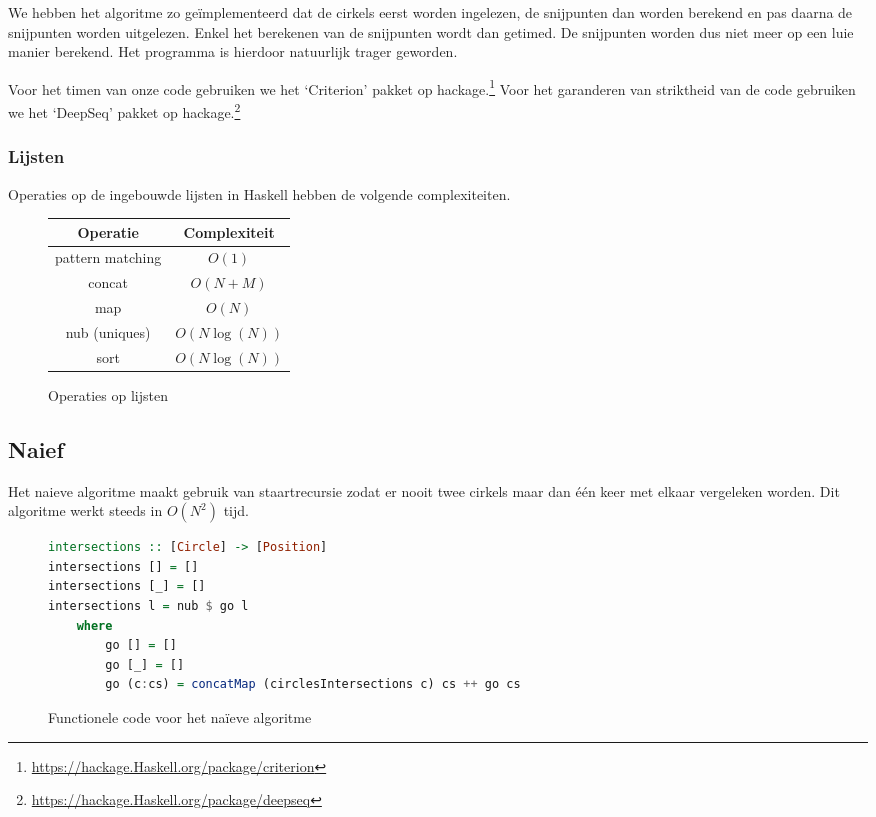 We hebben het algoritme zo ge\"implementeerd dat de cirkels eerst
worden ingelezen, de snijpunten dan worden berekend en pas daarna de
snijpunten worden uitgelezen. Enkel het berekenen van de snijpunten
wordt dan getimed. De snijpunten worden dus niet meer op een luie
manier berekend. Het programma is hierdoor natuurlijk trager geworden.

Voor het timen van onze code gebruiken we het `Criterion' pakket op hackage.\footnote{\url{https://hackage.Haskell.org/package/criterion}}
Voor het garanderen van striktheid van de code gebruiken we het `DeepSeq' pakket op hackage.\footnote{\url{https://hackage.Haskell.org/package/deepseq}}

\subsubsection{Lijsten}
Operaties op de ingebouwde lijsten in Haskell hebben de volgende complexiteiten.
\begin{figure}[H]
\centering
\begin{tabular}{|c|c|}
\hline
Operatie & Complexiteit\\
\hline\hline
pattern matching & $O(1)$\\\hline
concat & $O(N+M)$\\\hline
map & $O(N)$\\\hline
nub (uniques) & $O(N\log(N))$\\\hline
sort & $O(N\log(N))$\\\hline
\end{tabular}
\label{fig:list_performance}
\caption{Operaties op lijsten}
\end{figure}

\newpage
\subsection{Naief}
Het naieve algoritme maakt gebruik van staartrecursie zodat er nooit twee cirkels maar dan \'e\'en keer met elkaar vergeleken worden. Dit algoritme werkt steeds in $O(N^2)$ tijd.

\begin{figure}[H]
\begin{lstlisting}[language=haskell]
intersections :: [Circle] -> [Position]
intersections [] = []
intersections [_] = []
intersections l = nub $ go l
    where
        go [] = []
        go [_] = []
        go (c:cs) = concatMap (circlesIntersections c) cs ++ go cs
\end{lstlisting}
\label{imp:naive}
\caption{Functionele code voor het na\"ieve algoritme}
\end{figure}


